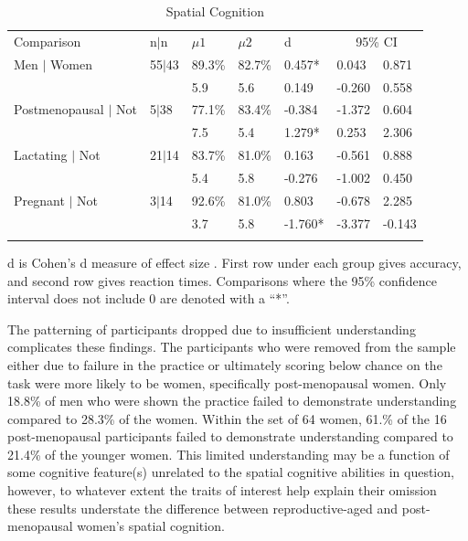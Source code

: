 \begin{table}[h!]
\caption{Spatial Cognition}
\label{tab:cog}  
\begin{tabular}{lllllll}
\hline\noalign{\smallskip}
Comparison & \phantom{0}n$|$n & $\mu1$ & $\mu2$ & d & \multicolumn{2}{c}{95\% CI} \\
\noalign{\smallskip}\hline\noalign{\smallskip}
Men $|$ Women & 55$|$43 & 89.3\% & 82.7\% & \phantom{-}0.457* & \phantom{-}0.043 & \phantom{-}0.871 \\
& & 5.9 & 5.6 & \phantom{-}0.149 & -0.260 & \phantom{-}0.558 \\
Postmenopausal $|$ Not & \phantom{0}5$|$38 & 77.1\% & 83.4\% & -0.384 & -1.372 & \phantom{-}0.604 \\
& & 7.5 & 5.4 & \phantom{-}1.279* & \phantom{-}0.253 & \phantom{-}2.306 \\
Lactating $|$ Not & 21$|$14 & 83.7\% & 81.0\% & \phantom{-}0.163 & -0.561 & \phantom{-}0.888 \\
& & 5.4 & 5.8 & -0.276 & -1.002 & \phantom{-}0.450 \\
Pregnant $|$ Not & 3$|$14 & 92.6\% & 81.0\% & \phantom{-}0.803 & -0.678 & \phantom{-}2.285 \\
& & 3.7 & 5.8 & -1.760* & -3.377 & -0.143 \\
\noalign{\smallskip}\hline
\end{tabular}\par
\bigskip
d is Cohen's d measure of effect size \cite{cohen1988statistical}. First row under each group gives accuracy, and second row gives reaction times.  Comparisons where the 95\% confidence interval does not include 0 are denoted with a ``*''.
\end{table}		  

The patterning of participants dropped due to insufficient understanding complicates these findings.  The participants who were removed from the sample either due to failure in the practice or ultimately scoring below chance on the task were more likely to be women, specifically post-menopausal women.  Only 18.8\% of men who were shown the practice failed to demonstrate understanding compared to 28.3\% of the women.  Within the set of 64 women, 61.\% of the 16 post-menopausal participants failed to demonstrate understanding compared to 21.4\% of the younger women.  This limited understanding may be a function of some cognitive feature(s) unrelated to the spatial cognitive abilities in question, however, to whatever extent the traits of interest help explain their omission these results understate the difference between reproductive-aged and post-menopausal women's spatial cognition.



